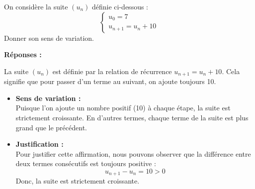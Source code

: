 \documentclass[a4paper,12pt]{article}
\begin{document}
  \bigskip
  
  \begin{tcolorbox}[colback=gray!10, colframe=gray!50, title=Exercice \textbf{95} page 129]
  On considère la suite $(u_n)$ définie ci-dessous :
  \[
  \left\{
    \begin{array}{l}
    u_0 = 7 \\
    u_{n+1} = u_n + 10
    \end{array}
  \right.
  \]
  Donner son sens de variation.
  \end{tcolorbox}
  
  \bigskip
  
  \textbf{Réponses :}
  
  La suite $(u_n)$ est définie par la relation de récurrence $u_{n+1} = u_n + 10$. Cela signifie que pour passer d'un terme au suivant, on ajoute toujours 10.
  
  \begin{itemize}
      \item \textbf{Sens de variation :} \\
      Puisque l'on ajoute un nombre positif (10) à chaque étape, la suite est strictement croissante. En d'autres termes, chaque terme de la suite est plus grand que le précédent.
      
      \item \textbf{Justification :} \\
      Pour justifier cette affirmation, nous pouvons observer que la différence entre deux termes consécutifs est toujours positive :
      \[
      u_{n+1} - u_n = 10 > 0
      \]
      Donc, la suite est strictement croissante.
  \end{itemize}
\end{document}
